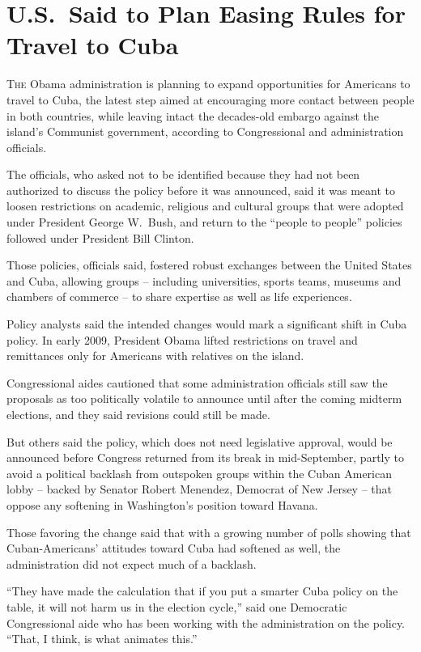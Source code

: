 ﻿\documentclass[12pt]{article}
\begin{document}
\section{U.S.~Said to Plan Easing Rules for Travel to Cuba}

\lettrine{T}{he} Obama administration is planning to expand opportunities
for Americans to travel to Cuba, the latest step aimed at encouraging more contact between people in
both countries, while leaving intact the decades-old embargo against the island's Communist
government, according to Congressional and administration officials.

The officials, who asked not to be identified because they had not been authorized to discuss the
policy before it was announced, said it was meant to loosen restrictions on academic, religious and
cultural groups that were adopted under President George W.~Bush, and return to the ``people to
people'' policies followed under President Bill Clinton.

Those policies, officials said, fostered robust exchanges between the United States and Cuba,
allowing groups -- including universities, sports teams, museums and chambers of commerce -- to
share expertise as well as life experiences.

Policy analysts said the intended changes would mark a significant shift in Cuba policy. In early
2009, President Obama lifted restrictions on travel and remittances only for Americans with
relatives on the island.

Congressional aides cautioned that some administration officials still saw the proposals as too
politically volatile to announce until after the coming midterm elections, and they said revisions
could still be made.

But others said the policy, which does not need legislative approval, would be announced before
Congress returned from its break in mid-September, partly to avoid a political backlash from
outspoken groups within the Cuban American lobby -- backed by Senator Robert Menendez, Democrat of
New Jersey -- that oppose any softening in Washington's position toward Havana.

Those favoring the change said that with a growing number of polls showing that Cuban-Americans'
attitudes toward Cuba had softened as well, the administration did not expect much of a backlash.

``They have made the calculation that if you put a smarter Cuba policy on the table, it will not
harm us in the election cycle,'' said one Democratic Congressional aide who has been working with
the administration on the policy. ``That, I think, is what animates this.''
\end{document}
